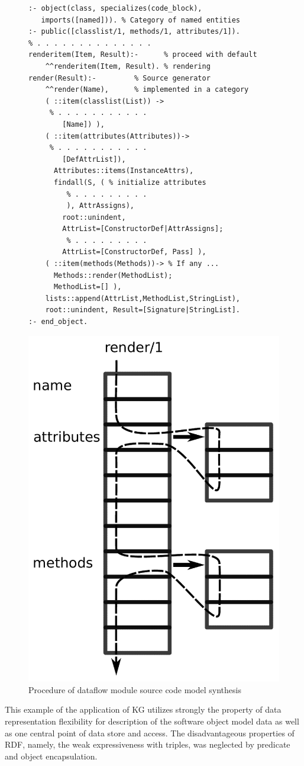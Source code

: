 \documentclass[
]{ceurart}
\begin{document}
\begin{figure}
  \centering
\begin{multicols}{2}
\begin{verbatim}
:- object(class, specializes(code_block),
   imports([named])). % Category of named entities
:- public([classlist/1, methods/1, attributes/1]).
% . . . . . . . . . . . . . .
renderitem(Item, Result):-      % proceed with default
    ^^renderitem(Item, Result). % rendering
render(Result):-         % Source generator
    ^^render(Name),      % implemented in a category
    ( ::item(classlist(List)) ->
     % . . . . . . . . . . .
        [Name]) ),
    ( ::item(attributes(Attributes))->
     % . . . . . . . . . . .
        [DefAttrList]),
      Attributes::items(InstanceAttrs),
      findall(S, ( % initialize attributes
         % . . . . . . . . .
         ), AttrAssigns),
        root::unindent,
        AttrList=[ConstructorDef|AttrAssigns];
         % . . . . . . . . .
        AttrList=[ConstructorDef, Pass] ),
    ( ::item(methods(Methods))-> % If any ...
      Methods::render(MethodList);
      MethodList=[] ),
    lists::append(AttrList,MethodList,StringList),
    root::unindent, Result=[Signature|StringList].
:- end_object.
\end{verbatim}
      \includegraphics[width=0.7\linewidth]{code_block_class.pdf}
\end{multicols}
  \caption{Procedure of dataflow module source code model synthesis}
  \label{fig:block-seq}
\end{figure}
This example of the application of KG utilizes strongly the property of data representation flexibility for description of the software object model data as well as one central point of data store and access.  The disadvantageous properties of RDF, namely, the weak expressiveness with triples, was neglected by predicate and object encapsulation.
\end{document}

